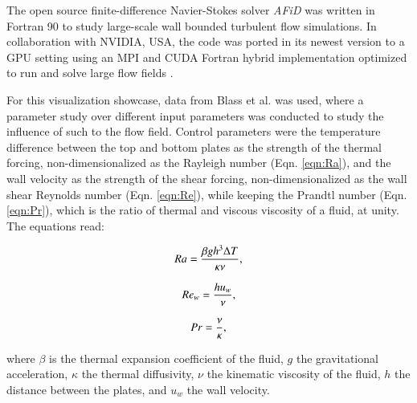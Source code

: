 \documentclass[final,5p,times,twocolumn]{elsarticle}
\begin{document}
The open source finite-difference Navier-Stokes solver \textit{AFiD} \cite{poe15c} was written in Fortran 90 to study large-scale wall bounded turbulent flow simulations. In collaboration with NVIDIA, USA, the code was ported in its newest version to a GPU setting using an MPI and CUDA Fortran hybrid implementation optimized to run and solve large flow fields \cite{zhu18b}.

For this visualization showcase, data from Blass et al. \cite{bla18} was used, where a parameter study over different input parameters was conducted to study the influence of such to the flow field. Control parameters were the temperature difference between the top and bottom plates as the strength of the thermal forcing, non-dimensionalized as the Rayleigh number (Eqn. \ref{eqn:Ra}), and the wall velocity as the strength of the shear forcing, non-dimensionalized as the wall shear Reynolds number (Eqn. \ref{eqn:Re}), while keeping the Prandtl number (Eqn. \ref{eqn:Pr}), which is the ratio of thermal and viscous viscosity of a fluid, at unity. The equations read:

\begin{equation} %
Ra= \frac{\beta gh^3\Delta T}{\kappa\nu}, 
\label{eqn:Ra} \\[8pt]
\end{equation}

\begin{equation} %
Re_w= \frac{hu_w}{\nu},
\label{eqn:Re} \\[8pt]
\end{equation}

\begin{equation} %
Pr= \frac{\nu}{\kappa},
\label{eqn:Pr} \\[8pt]
\end{equation}


where $ \beta $ is the thermal expansion coefficient of the fluid, $ g $ the
gravitational acceleration, $ \kappa $ the thermal diffusivity, $ \nu $ the
kinematic viscosity of the fluid, $ h $ the distance between the plates, and
$ u_w $ the wall velocity.
\end{document}
